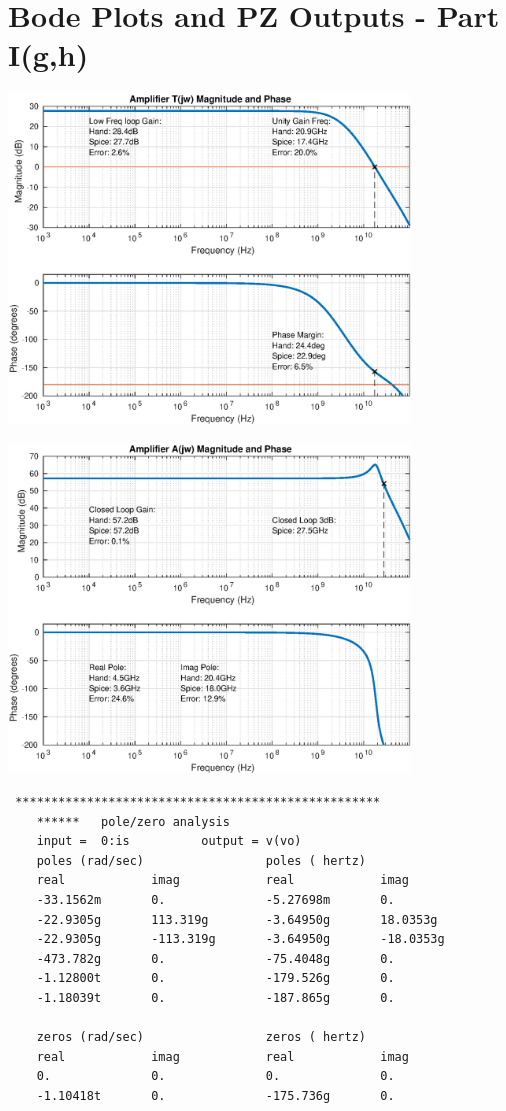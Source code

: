 \documentclass[12pt,a4paper]{article}
\begin{document}
\section{Bode Plots and PZ Outputs - Part I(g,h)}

{\centering
	\includegraphics[width=0.8\textwidth]{plots/part_g.eps}
\par}

\pagebreak

{\centering
	\includegraphics[width=0.8\textwidth]{plots/part_h.eps}
\par}

\begin{verbatim}
 ***************************************************
    ******   pole/zero analysis
    input =  0:is          output = v(vo)
    poles (rad/sec)                 poles ( hertz)
    real            imag            real            imag
    -33.1562m       0.              -5.27698m       0.
    -22.9305g       113.319g        -3.64950g       18.0353g
    -22.9305g       -113.319g       -3.64950g       -18.0353g
    -473.782g       0.              -75.4048g       0.
    -1.12800t       0.              -179.526g       0.
    -1.18039t       0.              -187.865g       0.

    zeros (rad/sec)                 zeros ( hertz)
    real            imag            real            imag
    0.              0.              0.              0.
    -1.10418t       0.              -175.736g       0.

\end{verbatim}
\end{document}

